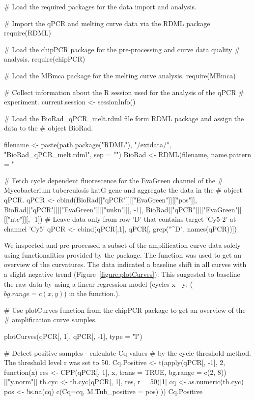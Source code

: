 \begin{example}
# Load the required packages for the data import and analysis.

# Import the qPCR and melting curve data via the RDML package
require(RDML)

# Load the chipPCR package for the pre-processing and curve data quality
# analysis.
require(chipPCR)

# Load the MBmca package for the melting curve analysis.
require(MBmca)

# Collect information about the R session used for the analysis of the qPCR
# experiment.
current.session <- sessionInfo()


# Load the BioRad_qPCR_melt.rdml file form RDML package and assign the data to 
the
# object BioRad.

filename <- paste(path.package("RDML"), "/extdata/", "BioRad_qPCR_melt.rdml", 
sep = "")
BioRad <- RDML(filename, name.pattern = "%

# Fetch cycle dependent fluorescence for the EvaGreen channel of the 
# Mycobacterium tuberculosis katG gene and aggregate the data in the 
# object qPCR. 
qPCR <- cbind(BioRad[["qPCR"]][["EvaGreen"]][["pos"]], 
	      BioRad[["qPCR"]][["EvaGreen"]][["unkn"]][, -1], 
	      BioRad[["qPCR"]][["EvaGreen"]][["ntc"]][, -1])
# Leave data only from row 'D' that contains target 'Cy5-2' at channel 'Cy5'
qPCR <- cbind(qPCR[,1], qPCR[, grep("^D", names(qPCR))])
\end{example}

We inspected and pre-processed a subset of the amplification curve data 
solely using functionalities provided by the  package. The 
 function was used to get an overview of the curvatures. The 
data indicated a baseline shift in all curves with a slight negative trend 
(Figure~\ref{figure:plotCurves}). This suggested to baseline the raw data by 
using a linear regression model (cycles x - y; ($bg.range = c(x, y)$) in the 
 function.).

\begin{example}
# Use plotCurves function from the chipPCR package to get an overview of the
# amplification curve samples.

plotCurves(qPCR[, 1], qPCR[, -1], type = "l")

# Detect positive samples - calculate Cq values
# by the cycle threshold method. The threshold level r was set to 50.
Cq.Positive <- t(apply(qPCR[, -1], 2, function(x)
{
  res <- CPP(qPCR[, 1], x, trans = TRUE, bg.range = c(2, 8))[["y.norm"]]
  th.cyc <- th.cyc(qPCR[, 1], res, r = 50)[1]
  cq <- as.numeric(th.cyc)
  pos <- !is.na(cq)
  c(Cq=cq, M.Tub_positive = pos)
}
))
Cq.Positive
\end{example}

